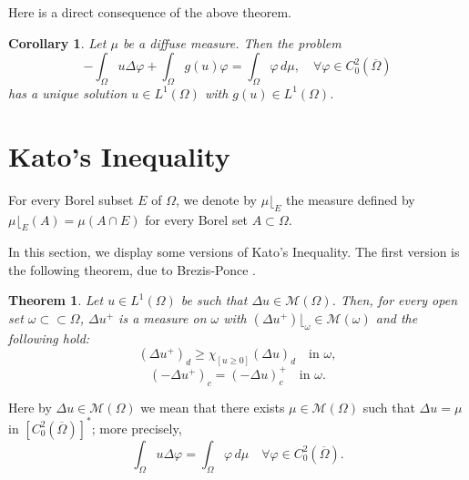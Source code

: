 \documentclass[a4paper, 11pt]{report}
\newtheorem{thm}{Theorem}[chapter]
\newtheorem{crr}{Corollary}[chapter]
\theoremstyle{definition}\newtheorem*{rmk}{Remark}
\begin{document}
Here is a direct consequence of the above theorem.

\begin{crr}\label{33crr}
Let $\mu$ be a diffuse measure. Then the problem
\[
-\int_{\Omega} u \Delta \varphi + \int_{\Omega} g(u)\varphi = \int_{\Omega}\varphi\, d\mu, \quad \forall \varphi \in C^2_0(\overline{\Omega})
\]
has a unique solution $u\in L^1(\Omega)$ with $g(u)\in L^1(\Omega)$.
\end{crr}

\section{Kato's Inequality}
\mbox{}

For every Borel subset $E$ of $\Omega$, we denote by $\mu\lfloor_E$ the measure defined by $\mu\lfloor_E(A) = \mu(A \cap E)$ for every Borel set $A \subset \Omega$.

In this section, we display some versions of Kato's Inequality. The first version is the following theorem, due to Brezis-Ponce \cite[Theorem 1.1]{BP}.

\begin{thm}\label{kato1thm}
Let $u\in L^1(\Omega)$ be such that $\Delta u \in \mathcal{M}(\Omega)$. Then, for every open set $\omega \subset\subset \Omega$, $\Delta u^+$ is a measure on $\omega$ with $(\Delta u^+)\lfloor_{\omega} \in \mathcal{M}(\omega)$ and the following hold:
\begin{equation}\label{kato1}
(\Delta u^+)_d \ge \chi_{[u \ge 0]}(\Delta u)_d \quad\text{in }\omega,
\end{equation}
\begin{equation}\label{kato2}
(-\Delta u^+)_c = (-\Delta u)_c^+ \quad\text{in }\omega.
\end{equation}
\end{thm}

Here by $\Delta u \in \mathcal{M}(\Omega)$ we mean that there exists $\mu \in \mathcal{M}(\Omega)$ such that $\Delta u = \mu$ in $[C^2_0(\overline{\Omega})]^*$; more precisely,
\[
\int_{\Omega}u\Delta \varphi = \int_{\Omega}\varphi\,d\mu \quad\forall \varphi \in C^2_0(\overline{\Omega}).
\]
\end{document}
